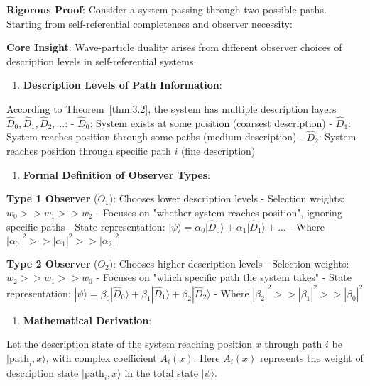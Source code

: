 \textbf{Rigorous Proof}:
Consider a system passing through two possible paths. Starting from self-referential completeness and observer necessity:

\textbf{Core Insight}: Wave-particle duality arises from different observer choices of description levels in self-referential systems.

\begin{enumerate}
\item \textbf{Description Levels of Path Information}:
\end{enumerate}
   
   According to Theorem~\ref{thm:3.2}, the system has multiple description layers ${\hat{D}_0, \hat{D}_1, \hat{D}_2, ...}$:
   - $\hat{D}_0$: System exists at some position (coarsest description)
   - $\hat{D}_1$: System reaches position through some paths (medium description)
   - $\hat{D}_2$: System reaches position through specific path $i$ (fine description)
   
\begin{enumerate}
\item \textbf{Formal Definition of Observer Types}:
\end{enumerate}
   
   \textbf{Type 1 Observer} ($O_1$): Chooses lower description levels
   - Selection weights: $w_0 >> w_1 >> w_2$
   - Focuses on "whether system reaches position", ignoring specific paths
   - State representation: $|\psi\rangle = \alpha_0|\hat{D}_0\rangle + \alpha_1|\hat{D}_1\rangle + ...$
   - Where $|\alpha_0|^2 >> |\alpha_1|^2 >> |\alpha_2|^2$
   
   \textbf{Type 2 Observer} ($O_2$): Chooses higher description levels
   - Selection weights: $w_2 >> w_1 >> w_0$
   - Focuses on "which specific path the system takes"
   - State representation: $|\psi\rangle = \beta_0|\hat{D}_0\rangle + \beta_1|\hat{D}_1\rangle + \beta_2|\hat{D}_2\rangle$
   - Where $|\beta_2|^2 >> |\beta_1|^2 >> |\beta_0|^2$

\begin{enumerate}
\item \textbf{Mathematical Derivation}:
\end{enumerate}
   
   Let the description state of the system reaching position $x$ through path $i$ be $|\text{path}_i, x\rangle$, with complex coefficient $A_i(x)$. Here $A_i(x)$ represents the weight of description state $|\text{path}_i, x\rangle$ in the total state $|\psi\rangle$.
   
